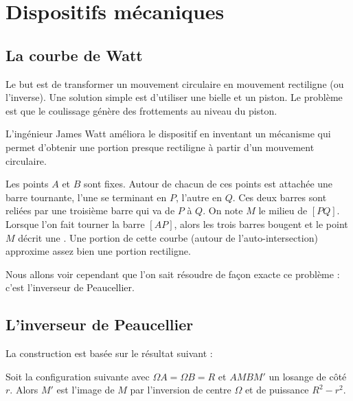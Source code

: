 \documentclass[11pt,class=report,crop=false]{standalone}
\begin{document}
\section{Dispositifs mécaniques}

\subsection{La courbe de Watt}

Le but est de transformer un mouvement circulaire en mouvement rectiligne
(ou l'inverse). Une solution simple est d'utiliser une bielle et un piston.
Le problème est que le coulissage génère des frottements au niveau du piston.


\bigskip

L'ingénieur James Watt améliora le dispositif en inventant un mécanisme
qui permet d'obtenir une portion presque rectiligne à partir d'un mouvement circulaire.


Les points $A$ et $B$ sont fixes. Autour de chacun de ces points est attachée une barre tournante, l'une se terminant en $P$, l'autre en $Q$. Ces deux barres sont reliées par une troisième barre qui va de $P$ à $Q$. 
On note $M$ le milieu de $[PQ]$. Lorsque l'on fait tourner la barre $[AP]$, alors les trois barres bougent et le point $M$ décrit une . Une portion de cette courbe (autour de l'auto-intersection) approxime assez bien une portion rectiligne.

Nous allons voir cependant que l'on sait résoudre de façon exacte ce problème : c'est l'inverseur de Peaucellier.

\subsection{L'inverseur de Peaucellier}

La construction est basée sur le résultat suivant :
\begin{theoreme}
\label{th:peaucellier}
Soit la configuration suivante avec $\Omega A = \Omega B = R$
et $AMBM'$ un losange de côté $r$.
Alors $M'$ est l'image de $M$ par l'inversion de centre $\Omega$
et de puissance $R^2-r^2$.
\end{theoreme}
\end{document}
